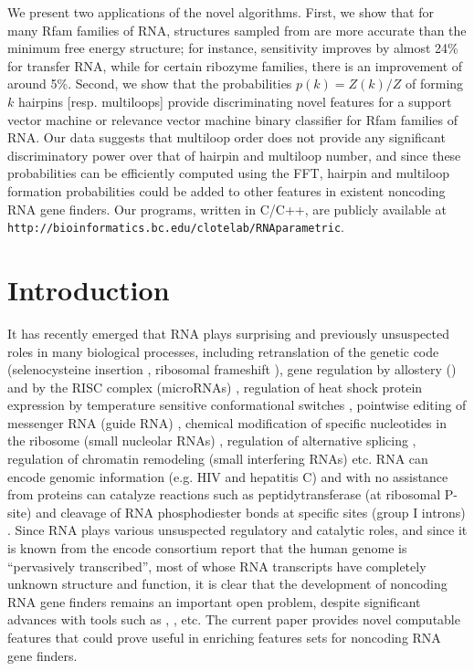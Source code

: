 We present two applications of the novel algorithms. First, we show that
for many Rfam families of RNA, structures sampled from {\rnahairpinml}
are more accurate than the minimum free energy structure; for instance,
sensitivity improves by almost 24\% for transfer RNA, while for
certain ribozyme families, there is an improvement of around 5\%.
Second, we show that the probabilities $p(k) = Z(k)/Z$
of forming $k$ hairpins [resp. multiloops] provide discriminating
novel features for a support vector machine or relevance vector machine
binary classifier for Rfam families of RNA.
Our data suggests that multiloop order does
not provide any significant discriminatory power over that of hairpin
and multiloop number, and since these probabilities
can be efficiently computed using the FFT, hairpin and multiloop formation
probabilities could be added to other features in existent
noncoding RNA gene finders.
Our programs, written in C/C++, are publicly available at
{\tt http://bioinformatics.bc.edu/clotelab/RNAparametric}.

\section{Introduction}

It has recently emerged that RNA plays surprising and previously unsuspected
roles in many biological processes, including retranslation of the genetic code
(selenocysteine insertion \citep{boeckForschhammer}, ribosomal frameshift
\citep{denise:frameshift}), gene regulation by allostery
(\rbs) \citep{mandalBoeseBarrickWinklerBreaker}
and by the RISC complex (microRNAs) \citep{burgeBartel:miRNAscience},
regulation of heat shock protein expression by
temperature sensitive conformational switches \citep{ROSEswitch,tuckerBreaker:review},
pointwise editing of messenger RNA (guide RNA)
\citep{haeseler:Cryptogenes}, chemical
modification of specific nucleotides in the ribosome (small nucleolar RNAs)
\citep{loweEddy:snoRNAinArchaea},
regulation of alternative splicing \citep{Cheah.n07},
regulation of chromatin remodeling (small interfering RNAs)
\citep{Cam.c09} etc. RNA can encode
genomic information (e.g. HIV and hepatitis C) and with no assistance
from proteins can catalyze reactions such as peptidytransferase
(at ribosomal P-site) \citep{weinger:peptidyltransferase}
and cleavage
of RNA phosphodiester bonds at specific sites (group I introns)
\citep{intron:reviewCech}.
Since RNA plays various unsuspected regulatory and catalytic roles, and
since it is known from the {\sc encode} consortium report
\citep{encodeConsortium} that
the human genome is ``pervasively transcribed'',
most of whose RNA transcripts have completely unknown structure
and function, it is clear that the development of
noncoding RNA gene finders
remains an important open problem, despite significant
advances with tools such as {\rnaz} \citep{Gruber.nar07},
{\foldalign} \citep{Havgaard.nar05}, etc. The current paper
provides novel computable features that could prove useful
in enriching features sets for noncoding RNA gene finders.


